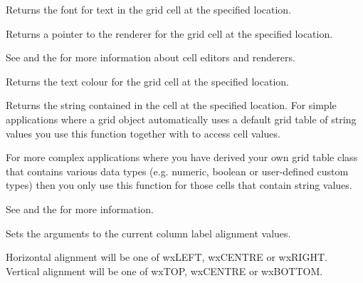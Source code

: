 
Returns the font for text in the grid cell at the specified location.

\label{wxgridgetcellrenderer}


Returns a pointer to the renderer for the grid cell at the specified location.

See  and
the  for more information about cell editors and renderers.

\label{wxgridgetcelltextcolour}


Returns the text colour for the grid cell at the specified location.

\label{wxgridgetcellvalue}



Returns the string contained in the cell at the specified location. For simple applications where a
grid object automatically uses a default grid table of string values you use this function together
with  to access cell values. 

For more complex applications where you have derived your own grid table class that contains
various data types (e.g. numeric, boolean or user-defined custom types) then you only use this
function for those cells that contain string values. 

See 
and the  for more information.

\label{wxgridgetcollabelalignment}


Sets the arguments to the current column label alignment values.

Horizontal alignment will be one of wxLEFT, wxCENTRE or wxRIGHT. \\
Vertical alignment will be one of wxTOP, wxCENTRE or wxBOTTOM.

